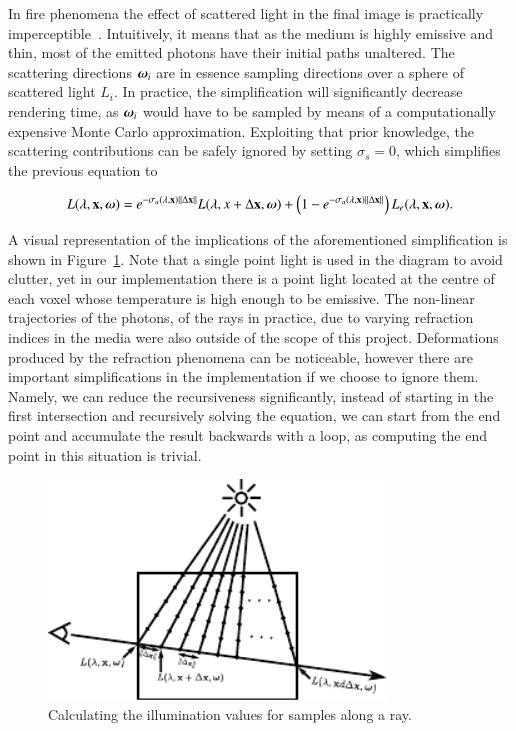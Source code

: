 In fire phenomena the effect of scattered light in the final image is practically imperceptible~\cite{Pegoraro:2006}.
Intuitively, it means that as the medium is highly emissive and thin, most of the emitted photons have their initial paths unaltered.
The scattering directions $\boldsymbol{\omega}_i$ are in essence sampling directions over a sphere of scattered light $L_i$.
In practice, the simplification will significantly decrease rendering time, as $\boldsymbol{\omega}_i$ would have to be sampled by means of a computationally expensive Monte Carlo approximation. 
Exploiting that prior knowledge, the scattering contributions can be safely ignored by setting $\sigma_s = 0$, which simplifies the previous equation to

\begin{equation}
L(\lambda, \mathbf{x}, \boldsymbol{\omega}) = e^{-\sigma_a(\lambda, \mathbf{x}) \left \| \Delta \mathbf{x} \right \|} L(\lambda, x + \Delta\mathbf{x}, \boldsymbol{\omega}) +  \left(1 - e^{-\sigma_a(\lambda, \mathbf{x}) \left \| \Delta \mathbf{x} \right \|} \right) L_e(\lambda, \mathbf{x}, \boldsymbol{\omega}).
\label{eq:rte_simplified}
\end{equation}

A visual representation of the implications of the aforementioned simplification is shown in Figure~\ref{fig:ray_marching}.
Note that a single point light is used in the diagram to avoid clutter, yet in our implementation there is a point light located at the centre of each voxel whose temperature is high enough to be emissive.
The non-linear trajectories of the photons, of the rays in practice, due to varying refraction indices in the media were also outside of the scope of this project.
Deformations produced by the refraction phenomena can be noticeable, however there are important simplifications in the implementation if we choose to ignore them.
Namely, we can reduce the recursiveness significantly, instead of starting in the first intersection and recursively solving the equation, we can start from the end point and accumulate the result backwards with a loop, as computing the end point in this situation is trivial.

\begin{figure}[htbp!]
	\centering
	\includegraphics[width=0.8\textwidth]{img/ray_marching}
	\caption{Calculating the illumination values for samples along a ray.}
	\label{fig:ray_marching}
\end{figure}

